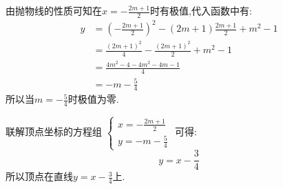 \begin{questions}
	\begin{solution}
		\begin{penum}
			\item 由抛物线的性质可知在$x=-\frac{2m+1}{2}$时有极值,代入函数中有:
			      \begin{align*}
				      y & = (-\frac{2m+1}{2})^2 - (2m+1)\frac{2m+1}{2} + m^2 - 1 \\
				        & = \frac{(2m+1)^2}{4} - \frac{(2m+1)^2}{2} + m^2 - 1    \\
				        & = \frac{4m^2 - 4 - 4m^2 - 4m - 1}{4}                   \\
				        & = -m - \frac54
			      \end{align*}
			      所以当$m=-\frac54$时极值为零.
			\item 联解顶点坐标的方程组
			      \begin{math}
				      \begin{cases}
					      x = -\frac{2m+1}{2} \\
					      y = -m - \frac54
				      \end{cases}
			      \end{math}
			      可得:
			      \begin{equation*}
				      y = x - \frac34
			      \end{equation*}
			      所以顶点在直线$y=x - \frac34$上.

			      \begin{center}
			      \end{center}


\end{penum}
\end{solution}
\end{questions}
